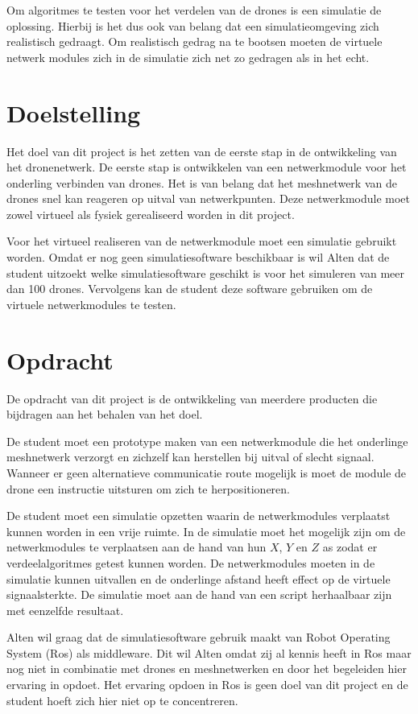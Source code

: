 \documentclass[a4paper, 11pt, oneside]{report}
\begin{document}
Om algoritmes te testen voor het verdelen van de drones is een simulatie de oplossing.
Hierbij is het dus ook van belang dat een simulatieomgeving zich realistisch gedraagt. 
Om realistisch gedrag na te bootsen moeten de virtuele netwerk modules zich in de simulatie zich net zo gedragen als in het echt.

\section{Doelstelling}\label{sec:doelstelling}
Het doel van dit project is het zetten van de eerste stap in de ontwikkeling van het dronenetwerk.
De eerste stap is ontwikkelen van een netwerkmodule voor het onderling verbinden van drones.
Het is van belang dat het meshnetwerk van de drones snel kan reageren op uitval van netwerkpunten.
Deze netwerkmodule moet zowel virtueel als fysiek gerealiseerd worden in dit project.

Voor het virtueel realiseren van de netwerkmodule moet een simulatie gebruikt worden. 
Omdat er nog geen simulatiesoftware beschikbaar is wil Alten dat de student uitzoekt welke simulatiesoftware geschikt is voor het simuleren van meer dan 100 drones.
Vervolgens kan de student deze software gebruiken om de virtuele netwerkmodules te testen.

\section{Opdracht}\label{sec:opdracht}
De opdracht van dit project is de ontwikkeling van meerdere producten die bijdragen aan het behalen van het doel. 

De student moet een prototype maken van een netwerkmodule die het onderlinge meshnetwerk verzorgt en zichzelf kan herstellen bij uitval of slecht signaal.
Wanneer er geen alternatieve communicatie route mogelijk is moet de module de drone een instructie uitsturen om zich te herpositioneren.

De student moet een simulatie opzetten waarin de netwerkmodules verplaatst kunnen worden in een vrije ruimte. 
In de simulatie moet het mogelijk zijn om de netwerkmodules te verplaatsen aan de hand van hun $X$, $Y$ en $Z$ as zodat er verdeelalgoritmes getest kunnen worden.  
De netwerkmodules moeten in de simulatie kunnen uitvallen en de onderlinge afstand heeft effect op de virtuele signaalsterkte.
De simulatie moet aan de hand van een script herhaalbaar zijn met eenzelfde resultaat.

Alten wil graag dat de simulatiesoftware gebruik maakt van Robot Operating System (Ros) als middleware. 
Dit wil Alten omdat zij al kennis heeft in Ros maar nog niet in combinatie met drones en meshnetwerken en door het begeleiden hier ervaring in opdoet.
Het ervaring opdoen in Ros is geen doel van dit project en de student hoeft zich hier niet op te concentreren.
\end{document}

